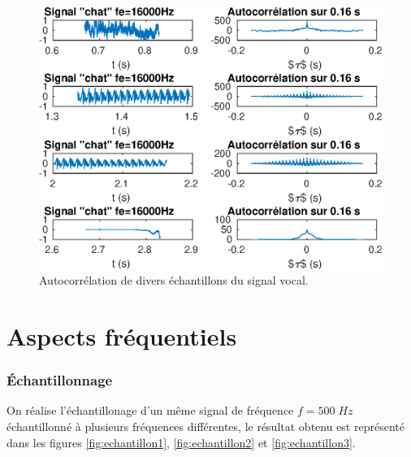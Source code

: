 \documentclass[french]{article}
\begin{document}
\begin{figure}[h!]
	\centering
	\includegraphics[width=\textwidth]{images/classificationVoix3.eps}
	\caption{Autocorrélation de divers échantillons du signal vocal.}
	\label{classif3}
\end{figure}

\FloatBarrier
\newpage

\part{Aspects fréquentiels}

\section{Échantillonnage}
On réalise l'échantillonage d'un même signal de fréquence $f=500 \; Hz$ échantillonné à plusieurs fréquences différentes, le résultat obtenu est représenté dans les figures \ref{fig:echantillon1}, \ref{fig:echantillon2} et \ref{fig:echantillon3}.
\end{document}
